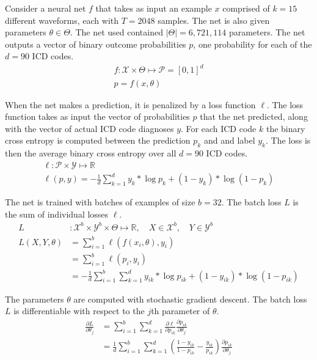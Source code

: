 Consider a neural net $f$ that takes as input an example $x$ comprised of $k=15$ different waveforms, each with $T=2048$ samples.  The net is also given parameters $\theta \in \Theta$.  The net used contained $|\Theta| = 6,721,114$ parameters.  The net outputs a vector of binary outcome probabilities $p$, one probability for each of the $d=90$ ICD codes.
\begin{gather}
    f: \mathcal{X} \times \Theta \mapsto \mathcal{P} = [0, 1]^d \\
    p = f(x, \theta)
\end{gather}

When the net makes a prediction, it is penalized by a loss function $\ell$.  The loss function takes as input the vector of probabilities $p$ that the net predicted, along with the vector of actual ICD code diagnoses $y$.  For each ICD code $k$ the binary cross entropy is computed between the prediction $p_k$ and and label $y_k$.  The loss is then the average binary cross entropy over all $d=90$ ICD codes.
\begin{gather}
    \ell: \mathcal{P} \times \mathcal{Y} \mapsto \mathbb{R} \\
    \ell(p, y) = -\frac{1}{d} \sum_{k=1}^d 
        y_k * \log p_k + (1 - y_k) * \log(1 - p_k)
\end{gather}

The net is trained with batches of examples of size $b = 32$.  The batch loss $L$ is the sum of individual losses $\ell$.
\begin{align}
    L &: \mathcal{X}^b \times \mathcal{Y}^b 
        \times \Theta \mapsto \mathbb{R}, \quad
        X \in \mathcal{X}^b, \quad 
        Y \in \mathcal{Y}^b \\
    L(X, Y, \theta) 
        &= \sum_{i=1}^b \ell(f(x_i, \theta), y_i) \\
        &= \sum_{i=1}^b \ell(p_i, y_i) \\
        &= -\frac{1}{d} \sum_{i=1}^b \sum_{k=1}^d 
            y_{ik} * \log p_{ik} + (1 - y_{ik}) * \log(1 - p_{ik})
\end{align}

The parameters $\theta$ are computed with stochastic gradient descent.  The batch loss $L$ is differentiable with respect to the $j$th parameter of $\theta$.
\begin{align}
    \frac{\partial L}{\partial \theta_j} 
        &= \sum_{i=1}^b \sum_{k=1}^d 
            \frac{\partial \ell}{\partial p_{ik}}  
            \frac{\partial p_{ik}}{\partial \theta_j} \\
        &= \frac{1}{d} \sum_{i=1}^b \sum_{k=1}^d
            \left(
                \frac{1 - y_{ik}}{1 - p_{ik}} - \frac{y_{ik}}{p_{ik}}
            \right)
            \frac{\partial p_{ik}}{\partial \theta_j}
\end{align}

